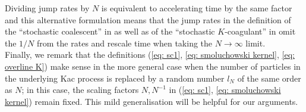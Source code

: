 Dividing jump rates by $N$ is equivalent to accelerating time by the same factor and this alternative formulation means that the jump rates in the definition of the ``stochastic coalescent'' in  \cite{A99} as well as of the ``stochastic $K$-coagulant'' in \cite{N00} omit the $1/N$ from the rates and rescale time when taking the $N\rightarrow \infty$ limit. \medskip \\ Finally, we remark  that the definitions (\ref{eq: sc1}, \ref{eq: smoluchowski kernel}, \ref{eq: overline K}) make sense in the more general case when the number of particles in the underlying Kac process is replaced by a random number $l_N$ of the same order as $N$; in this case, the scaling factors $N, N^{-1}$ in (\ref{eq: sc1}, \ref{eq: smoluchowski kernel}) remain fixed. This mild generalisation will be helpful for our arguments.

